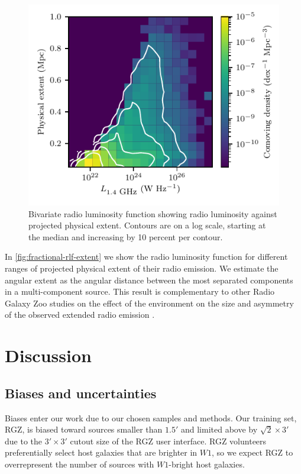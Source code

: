       \begin{figure}
          \centering
        \includegraphics{rlf-images/physical-extent.pdf}
        \caption{Bivariate radio luminosity function showing radio luminosity against projected physical extent. Contours are on a log scale, starting at the median and increasing by 10 percent per contour.
        \label{fig:fractional-rlf-extent}}
      \end{figure}

      In \autoref{fig:fractional-rlf-extent} we show the radio luminosity
      function for different ranges of projected physical extent of their radio emission. We estimate the angular extent as the angular distance between the most separated components in a multi-component source. This result is complementary to other Radio Galaxy Zoo studies on the effect of the environment on the size and asymmetry of the observed extended radio emission \citep{rodman19asymmetry,garon19bending}.


\section{Discussion}\label{sec:discussion}

  \subsection{Biases and uncertainties}
    \label{sec:bias}

    Biases enter our work due to our chosen samples and methods. Our training set,
    RGZ, is biased toward sources smaller than $1.5'$ and limited above by $\sqrt{2}
    \times 3'$ due to the $3' \times 3'$ cutout size of the RGZ user
    interface. RGZ volunteers preferentially select host
    galaxies that are brighter in $W1$, so we expect RGZ to overrepresent
    the number of sources with $W1$-bright host galaxies.

